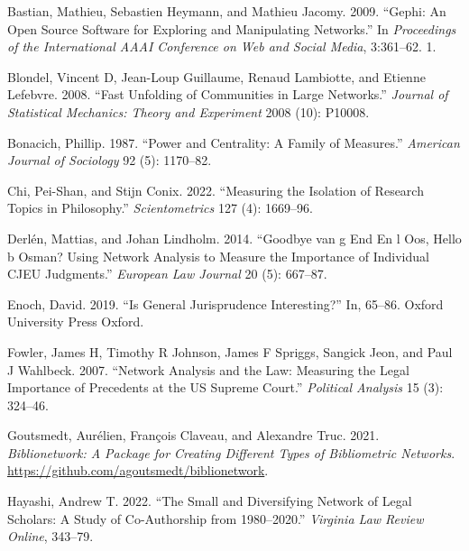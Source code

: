 \documentclass[
]{article}
\newlength{\cslhangindent}
\newlength{\cslentryspacingunit} %
\newenvironment{CSLReferences}[2] %
 {%
  \setlength{\parindent}{0pt}
  \ifodd #1
  \let\oldpar\par
  \def\par{\hangindent=\cslhangindent\oldpar}
  \fi
  \setlength{\parskip}{#2\cslentryspacingunit}
 }%
 {}
\begin{document}
\hypertarget{refs}{}
\begin{CSLReferences}{1}{0}
\leavevmode{}%
Bastian, Mathieu, Sebastien Heymann, and Mathieu Jacomy. 2009. {``Gephi: An Open Source Software for Exploring and Manipulating Networks.''} In \emph{Proceedings of the International AAAI Conference on Web and Social Media}, 3:361--62. 1.

\leavevmode{}%
Blondel, Vincent D, Jean-Loup Guillaume, Renaud Lambiotte, and Etienne Lefebvre. 2008. {``Fast Unfolding of Communities in Large Networks.''} \emph{Journal of Statistical Mechanics: Theory and Experiment} 2008 (10): P10008.

\leavevmode{}%
Bonacich, Phillip. 1987. {``Power and Centrality: A Family of Measures.''} \emph{American Journal of Sociology} 92 (5): 1170--82.

\leavevmode{}%
Chi, Pei-Shan, and Stijn Conix. 2022. {``Measuring the Isolation of Research Topics in Philosophy.''} \emph{Scientometrics} 127 (4): 1669--96.

\leavevmode{}%
Derlén, Mattias, and Johan Lindholm. 2014. {``Goodbye van g End En l Oos, Hello b Osman? Using Network Analysis to Measure the Importance of Individual CJEU Judgments.''} \emph{European Law Journal} 20 (5): 667--87.

\leavevmode{}%
Enoch, David. 2019. {``Is General Jurisprudence Interesting?''} In, 65--86. Oxford University Press Oxford.

\leavevmode{}%
Fowler, James H, Timothy R Johnson, James F Spriggs, Sangick Jeon, and Paul J Wahlbeck. 2007. {``Network Analysis and the Law: Measuring the Legal Importance of Precedents at the US Supreme Court.''} \emph{Political Analysis} 15 (3): 324--46.

\leavevmode{}%
Goutsmedt, Aurélien, François Claveau, and Alexandre Truc. 2021. \emph{Biblionetwork: A Package for Creating Different Types of Bibliometric Networks}. \url{https://github.com/agoutsmedt/biblionetwork}.

\leavevmode{}%
Hayashi, Andrew T. 2022. {``The Small and Diversifying Network of Legal Scholars: A Study of Co-Authorship from 1980--2020.''} \emph{Virginia Law Review Online}, 343--79.


\end{CSLReferences}
\end{document}
